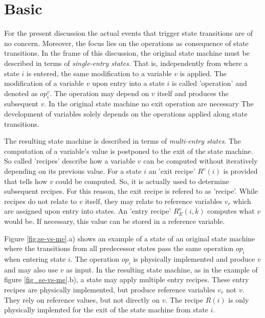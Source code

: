 \documentclass[12pt,a4paper]{scrartcl}
\begin{document}
%
\section{Basic}

For the present discussion the actual events that trigger state transitions are
of no concern. Moreover, the focus lies on the operations as consequence of
state transitions. In the frame of this discussion, the original state machine
must be described in terms of \textit{single-entry states}. That is,
independently from where a state $i$ is entered, the same modification to a
variable $v$ is applied. The modification of a variable $v$ upon entry into a
state $i$ is called 'operation' and denoted as $op^v_i$. The operation may
depend on $v$ itself and produces the subsequent $v$. In the original state
machine no exit operation are necessary The development of variables solely
depends on the operations applied along state transitions. 

The resulting state machine is described in terms of \textit{multi-entry
states}. The computation of a variable's value is postponed to the exit of the
state machine. So called 'recipes' describe how a variable $v$ can be computed
without iteratively depending on its previous value.  For a state $i$ an 'exit
recipe' $R^v(i)$ is provided that tells how $v$ could be computed.  So, it is
actually used to determine subsequent recipes. For this reason, the exit recipe
is refered to as 'recipe'.  While recipes do not relate to $v$ itself, they may
relate to reference variables $v_r$ which are assigned upon entry into states.
An 'entry recipe' $R^v_E(i,k)$ computes what $v$ would be.  If necessary, this
value can be stored in a reference variable.

Figure \ref{fig:se-vs-me}.a) shows an example of a state of an original state
machine where the transitions from all predecessor states pass the same
operation $op_i$ when entering state $i$. The operation $op_i$ is physically
implemented and produce $v$ and may also use $v$ as input. In the resulting
state machine, as in the example of figure \ref{fig_se-vs-me}.b), a state may
apply multiple entry recipes. These entry recipes are physically implemented,
but produce reference variables $v_r$ not $v$.  They rely on reference values,
but not directly on $v$. The recipe $R(i)$ is only physically implemted for the
exit of the state machine from state $i$.  
\end{document}

